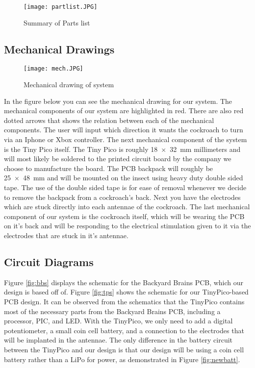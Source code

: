\documentclass{article}
\begin{document}
\begin{figure}
\texttt{[image: partlist.JPG]}
\caption{Summary of Parts list}
\label{fig:partlist}
\end{figure}

\subsection{Mechanical Drawings}
\begin{figure}[ht!]
\centering
\texttt{[image: mech.JPG]}
\caption{Mechanical drawing of system}
\label{fig:mech}
\end{figure}



 In the figure below you can see the mechanical drawing for our system. The mechanical components of our system are highlighted in red. There are also red dotted arrows that shows the relation between each of the mechanical components. The user will input which direction it wants the cockroach to turn via an Iphone or Xbox controller. The next mechanical component of the system is the Tiny Pico itself. The Tiny Pico is roughly \SI{18x32}{\milli\meter} millimeters and will most likely be soldered to the printed circuit board by the company we choose to manufacture the board. The PCB backpack will roughly be \SI{25x48}{\milli\meter} and will be mounted on the insect using heavy duty double sided tape. The use of the double sided tape is for ease of removal whenever we decide to remove the backpack from a cockroach's back. Next you have the electrodes which are stuck directly into each antennae of the cockroach. The last mechanical component of our system is the cockroach itself, which will be wearing the PCB on it's back and will be responding to the electrical stimulation given to it via the electrodes that are stuck in it's antennae. 

\subsection{Circuit Diagrams}
 Figure \ref{fig:bbs} displays the schematic for the Backyard Brains PCB, which our design is based off of. Figure \ref{fig:tps} shows the schematic for our TinyPico-based PCB design. It can be observed from the schematics that the TinyPico contains most of the necessary parts from the Backyard Brains PCB, including a processor, PIC, and LED. With the TinyPico, we only need to add a digital potentiometer, a small coin cell battery, and a connection to the electrodes that will be implanted in the antennae. The only difference in the battery circuit between the TinyPico and our design is that our design will be using a coin cell battery rather than a LiPo for power, as demonstrated in Figure \ref{fig:newbatt}.
\end{document}

